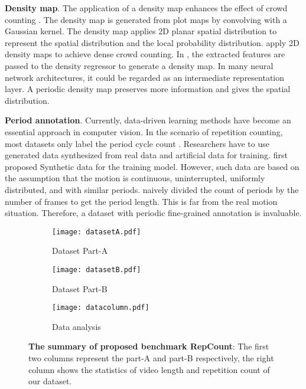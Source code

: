 \documentclass[10pt,twocolumn,letterpaper]{article}
\begin{document}
\noindent \textbf{Density map}.
The application of a density map enhances the effect of crowd counting \cite{MCNN,Wan_2019_ICCV,Ranjan_2018_ECCV,liu2019context}. The density map is generated from plot maps by convolving with a Gaussian kernel. The density map applies 2D  planar spatial distribution to represent the spatial distribution and the local probability distribution. \cite{MCNN} apply 2D density maps to achieve dense crowd counting. In \cite{tan2019crowd}, the extracted features are passed to the density regressor to generate a density map. In many neural network architectures, it could be regarded as an intermediate representation layer. A periodic density map preserves more information and gives the spatial distribution.

\noindent \textbf{Period annotation}.
Currently, data-driven learning methods have become an essential approach in computer vision. In the scenario of repetition counting, most datasets only label the period cycle count \cite{RepNet, Zhang_2020_CVPR,kay2017kinetics}. Researchers have to use generated data synthesized from real data and artificial data for training. \cite{synthesized} first proposed Synthetic data for the training model. However, such data are based on the assumption that the motion is continuous, uninterrupted, uniformly distributed, and with similar periods. \cite{RepNet} naively divided the count of periods by the number of frames to get the period length. This is far from the real motion situation. Therefore, a dataset with periodic fine-grained annotation is invaluable.





\begin{figure*}[ht!]
    \centering
    \begin{subfigure}{0.5\textwidth}
      \centering   
      \texttt{[image: datasetA.pdf]}
       \caption{Dataset Part-A}
    \end{subfigure}      
    \hfill
    \vline
    \hfill  
    \begin{subfigure}{0.17\textwidth}
        \centering   
        \texttt{[image: datasetB.pdf]}
        \caption{Dataset Part-B}
    \end{subfigure}
    \hfill
    \vline
    \hfill
    \begin{subfigure}{0.22\textwidth}
        \centering   
        \texttt{[image: datacolumn.pdf]}
        \caption{Data analysis}
\end{subfigure}
    \caption{
    \textbf{The summary of proposed benchmark RepCount}: The first two columns represent the part-A and part-B respectively, the right column shows the statistics of video length and repetition count of our dataset.
    }
\label{fig:datashow}
\end{figure*}
\end{document}
